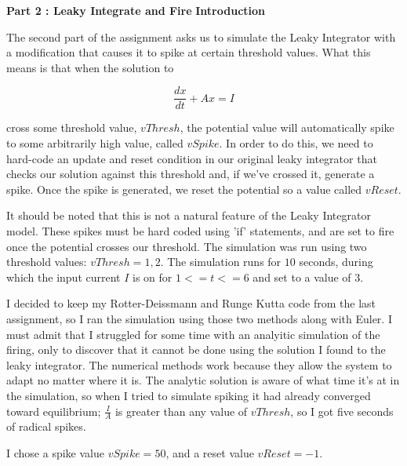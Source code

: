 \documentclass[a4paper,12pt]{article}
\begin{document}
\vfil\eject

\bigskip
{\bf Part 2 : Leaky Integrate and Fire}
\vspace{2mm}
{\bf Introduction}
\bigskip

The second part of the assignment asks us to simulate the Leaky Integrator with a modification that causes it to spike at certain threshold values. What this means is that when the solution to 

\begin{equation}
\frac{dx}{dt}+Ax=I
\end{equation}

cross some threshold value, $vThresh$, the potential value will automatically spike to some arbitrarily high value, called $vSpike$. In order to do this, we need to hard-code an update and reset condition in our original leaky integrator that checks our solution against this threshold and, if we've crossed it, generate a spike. Once the spike is generated, we reset the potential so a value called $vReset$. 

\vspace{2mm}

It should be noted that this is not a natural feature of the Leaky Integrator model. These spikes must be hard coded using 'if' statements, and are set to fire once the potential crosses our threshold. The simulation was run using two threshold values: $vThresh = 1,2$. The simulation runs for $10$ seconds, during which the input current $I$ is on for $1<=t<=6$ and set to a value of $3$. 

\vspace{2mm}

I decided to keep my Rotter-Deissmann and Runge Kutta code from the last assignment, so I ran the simulation using those two methods along with Euler. I must admit that I struggled for some time with an analyitic simulation of the firing, only to discover that it cannot be done using the solution I found to the leaky integrator. The numerical methods work because they allow the system to adapt no matter where it is. The analytic solution is aware of what time it's at in the simulation, so when I tried to simulate spiking it had already converged toward equilibrium; $\frac{I}{A}$ is greater than any value of $vThresh$, so I got five seconds of radical spikes. 

\vspace{2mm}

I chose a spike value $vSpike = 50$, and a reset value $vReset = -1$. 
\end{document}
